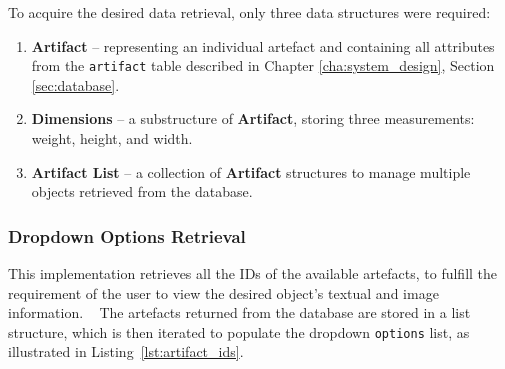To acquire the desired data retrieval, only three data structures were required:  
\begin{enumerate}
    \item \textbf{Artifact} – representing an individual artefact and containing all attributes from the \texttt{artifact} table described in Chapter \ref{cha:system_design}, Section \ref{sec:database}.  
    \item \textbf{Dimensions} – a substructure of \textbf{Artifact}, storing three measurements: weight, height, and width.  
    \item \textbf{Artifact List} – a collection of \textbf{Artifact} structures to manage multiple objects retrieved from the database.  
\end{enumerate}



\subsubsection{Dropdown Options Retrieval}
\label{sec:options}

This implementation retrieves all the IDs of the available artefacts, to fulfill the requirement of the user to view the desired object's textual and image information.  
The artefacts returned from the database are stored in a list structure, which is then iterated to populate the dropdown \texttt{options} list, as illustrated in Listing~\ref{lst:artifact_ids}.

